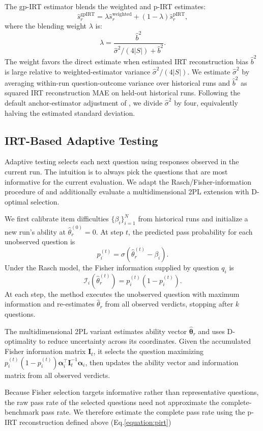 The gp-IRT estimator blends the weighted and p-IRT estimates:
\begin{equation}
  \hat{s}_r^{\mathrm{gpIRT}}
  = \lambda\hat{s}_r^{\mathrm{weighted}}
    +(1-\lambda)\hat{s}_r^{\mathrm{pIRT}},
\end{equation}
where the blending weight 
$\lambda$ is:
\begin{equation}
  \lambda =
  \frac{\hat{b}^{2}}
       {\hat{\sigma}^{2}/(4|S|)+\hat{b}^{2}}.
\end{equation}
The weight favors the direct estimate when estimated IRT reconstruction bias
$\hat{b}^2$ is large relative to weighted-estimator variance
$\hat{\sigma}^2/(4|S|)$. We estimate $\hat{\sigma}^2$ by averaging within-run
question-outcome variance over historical runs and $\hat{b}^2$ as squared IRT
reconstruction MAE on held-out historical runs. Following the default
anchor-estimator adjustment of \citet{maiapolo2024tinybenchmarks}, we divide
$\hat{\sigma}^2$ by four, equivalently halving the estimated standard deviation.




\subsection{IRT-Based Adaptive Testing}
\label{sec:method-adaptive}
Adaptive testing selects each next question using responses observed in the
current run. The intuition is to always pick the questions
that are most informative for the current evaluation. We adapt the Rasch/Fisher-information procedure of
\citet{truong2025reliable} and additionally evaluate a multidimensional 2PL extension with
D-optimal selection.

We first calibrate item difficulties $\{\beta_i\}_{i=1}^N$ from historical runs
and initialize a new run’s ability at $\hat{\theta}_r^{(0)}=0$. At step $t$, the
predicted pass probability for each unobserved question is
\begin{equation}
  p_i^{(t)}=\sigma(\hat{\theta}_r^{(t)}-\beta_i).
\end{equation}
Under the Rasch model, the Fisher information supplied by question $q_i$ is
\begin{equation}
  \mathcal{I}_i(\hat{\theta}_r^{(t)})
  =p_i^{(t)}(1-p_i^{(t)}).
\end{equation}
At each step, the method executes the unobserved question with maximum
information and re-estimates $\hat{\theta}_r$ from all observed verdicts,
stopping after $k$ questions.

The multidimensional 2PL variant estimates ability vector
$\hat{\boldsymbol{\theta}}_r$ and uses D-optimality to reduce uncertainty across
its coordinates. Given the accumulated Fisher information matrix $\mathbf{I}_t$,
it selects the question maximizing
$p_i^{(t)}(1-p_i^{(t)})\boldsymbol{\alpha}_i^\top
\mathbf{I}_t^{-1}\boldsymbol{\alpha}_i$, then updates the ability vector and
information matrix from all observed verdicts.

Because Fisher selection targets informative rather than representative
questions, the raw pass rate of the selected questions need not approximate the
complete-benchmark pass rate. We therefore estimate
the complete pass rate using the p-IRT reconstruction defined above (Eq.\ref{equation:pirt})